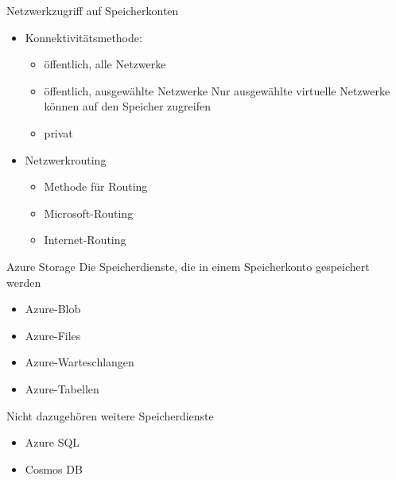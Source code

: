 \begin{flashcard}[Definition]{Netzwerkzugriff auf Speicherkonten}
    \begin{itemize}
        \item Konnektivitätsmethode:
        \begin{itemize}
            \item öffentlich, alle Netzwerke
            \item öffentlich, ausgewählte Netzwerke\newline
            Nur ausgewählte virtuelle Netzwerke können auf den Speicher zugreifen
            \item privat
        \end{itemize}
        \item Netzwerkrouting
        \begin{itemize}
            \item Methode für Routing
            \item Microsoft-Routing
            \item Internet-Routing
        \end{itemize}

    \end{itemize}
\end{flashcard}


\begin{flashcard}[Definition]{Azure Storage}
    Die Speicherdienste, die in einem Speicherkonto gespeichert werden
    \begin{itemize}
        \item Azure-Blob
        \item Azure-Files
        \item Azure-Warteschlangen
        \item Azure-Tabellen
    \end{itemize}
    Nicht dazugehören weitere Speicherdienste
    \begin{itemize}
        \item Azure SQL
        \item Cosmos DB
    \end{itemize}
\end{flashcard}

